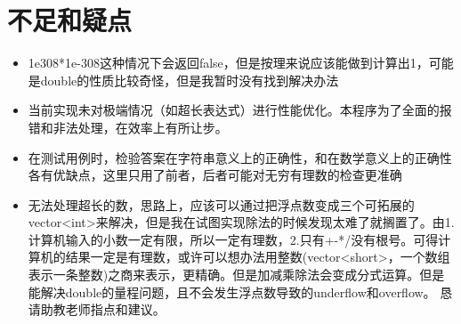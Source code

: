 \documentclass[12pt,a4paper]{article}
\begin{document}
\section{不足和疑点}
\begin{itemize}
    \item 1e308*1e-308这种情况下会返回false，但是按理来说应该能做到计算出1，可能是double的性质比较奇怪，但是我暂时没有找到解决办法
    \item 当前实现未对极端情况（如超长表达式）进行性能优化。本程序为了全面的报错和非法处理，在效率上有所让步。
    \item 在测试用例时，检验答案在字符串意义上的正确性，和在数学意义上的正确性各有优缺点，这里只用了前者，后者可能对无穷有理数的检查更准确
    \item 无法处理超长的数，思路上，应该可以通过把浮点数变成三个可拓展的vector<int>来解决，但是我在试图实现除法的时候发现太难了就搁置了。由1.计算机输入的小数一定有限，所以一定有理数，2.只有+-*/没有根号。可得计算机的结果一定是有理数，或许可以想办法用整数(vector<short>，一个数组表示一条整数)之商来表示，更精确。但是加减乘除法会变成分式运算。但是能解决double的量程问题，且不会发生浮点数导致的underflow和overflow。
    恳请助教老师指点和建议。
\end{itemize}
\end{document}
